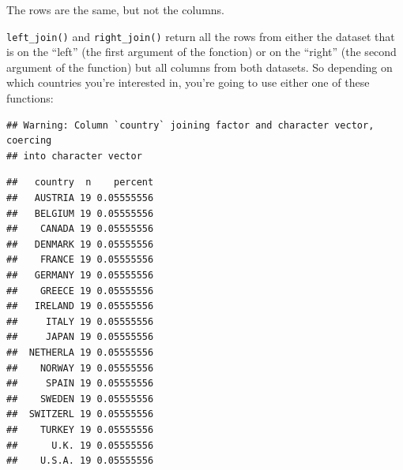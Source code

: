 \documentclass[]{gitbook}
\newenvironment{Shaded}{\begin{snugshade}}{\end{snugshade}}
\newcommand{\DataTypeTok}[1]{\textcolor[rgb]{0.13,0.29,0.53}{#1}}
\newcommand{\KeywordTok}[1]{\textcolor[rgb]{0.13,0.29,0.53}{\textbf{#1}}}
\newcommand{\NormalTok}[1]{#1}
\newcommand{\OperatorTok}[1]{\textcolor[rgb]{0.81,0.36,0.00}{\textbf{#1}}}
\newcommand{\StringTok}[1]{\textcolor[rgb]{0.31,0.60,0.02}{#1}}
\begin{document}
The rows are the same, but not the columns.

\texttt{left\_join()} and \texttt{right\_join()} return all the rows from either the dataset that is on the
``left'' (the first argument of the fonction) or on the ``right'' (the second argument of the
function) but all columns from both datasets. So depending on which countries you're interested in,
you're going to use either one of these functions:

\begin{Shaded}
\end{Shaded}

\begin{verbatim}
## Warning: Column `country` joining factor and character vector, coercing
## into character vector
\end{verbatim}

\begin{Shaded}
\end{Shaded}

\begin{verbatim}
##   country  n    percent
##   AUSTRIA 19 0.05555556
##   BELGIUM 19 0.05555556
##    CANADA 19 0.05555556
##   DENMARK 19 0.05555556
##    FRANCE 19 0.05555556
##   GERMANY 19 0.05555556
##    GREECE 19 0.05555556
##   IRELAND 19 0.05555556
##     ITALY 19 0.05555556
##     JAPAN 19 0.05555556
##  NETHERLA 19 0.05555556
##    NORWAY 19 0.05555556
##     SPAIN 19 0.05555556
##    SWEDEN 19 0.05555556
##  SWITZERL 19 0.05555556
##    TURKEY 19 0.05555556
##      U.K. 19 0.05555556
##    U.S.A. 19 0.05555556
\end{verbatim}

\begin{Shaded}
\end{Shaded}
\end{document}
